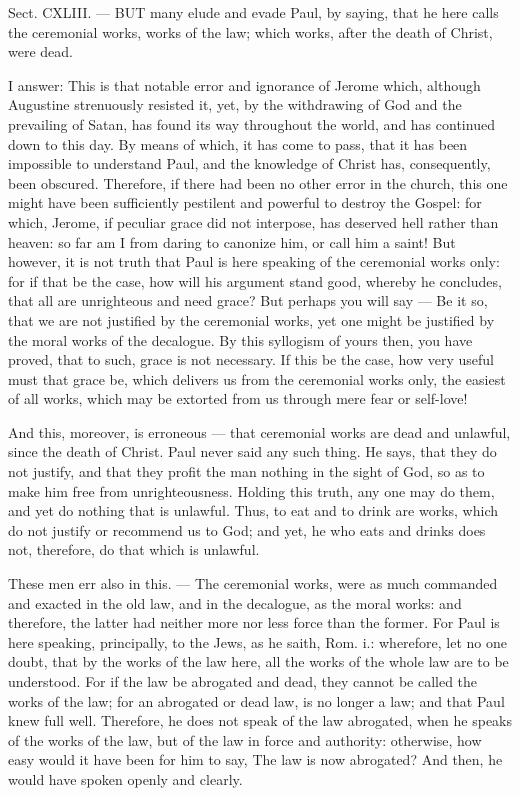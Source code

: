
Sect. CXLIII. — BUT many elude and evade Paul, by saying, that he here calls the ceremonial works, works of the law; which works, after the death of Christ, were dead.

I answer: This is that notable error and ignorance of Jerome which, although Augustine strenuously resisted it, yet, by the withdrawing of God and the prevailing of Satan, has found its way throughout the world, and has continued down to this day. By means of which, it has come to pass, that it has been impossible to understand Paul, and the knowledge of Christ has, consequently, been obscured. Therefore, if there had been no other error in the church, this one might have been sufficiently pestilent and powerful to destroy the Gospel: for which, Jerome, if peculiar grace did not interpose, has deserved hell rather than heaven: so far am I from daring to canonize him, or call him a saint! But however, it is not truth that Paul is here speaking of the ceremonial works only: for if that be the case, how will his argument stand good, whereby he concludes, that all are unrighteous and need grace? But perhaps you will say — Be it so, that we are not justified by the ceremonial works, yet one might be justified by the moral works of the decalogue. By this syllogism of yours then, you have proved, that to such, grace is not necessary. If this be the case, how very useful must that grace be, which delivers us from the ceremonial works only, the easiest of all works, which may be extorted from us through mere fear or self-love!

And this, moreover, is erroneous — that ceremonial works are dead and unlawful, since the death of Christ. Paul never said any such thing. He says, that they do not justify, and that they profit the man nothing in the sight of God, so as to make him free from unrighteousness. Holding this truth, any one may do them, and yet do nothing that is unlawful. Thus, to eat and to drink are works, which do not justify or recommend us to God; and yet, he who eats and drinks does not, therefore, do that which is unlawful.

These men err also in this. — The ceremonial works, were as much commanded and exacted in the old law, and in the decalogue, as the moral works: and therefore, the latter had neither more nor less force than the former. For Paul is here speaking, principally, to the Jews, as he saith, Rom. i.: wherefore, let no one doubt, that by the works of the law here, all the works of the whole law are to be understood. For if the law be abrogated and dead, they cannot be called the works of the law; for an abrogated or dead law, is no longer a law; and that Paul knew full well. Therefore, he does not speak of the law abrogated, when he speaks of the works of the law, but of the law in force and authority: otherwise, how easy would it have been for him to say, The law is now abrogated? And then, he would have spoken openly and clearly.

